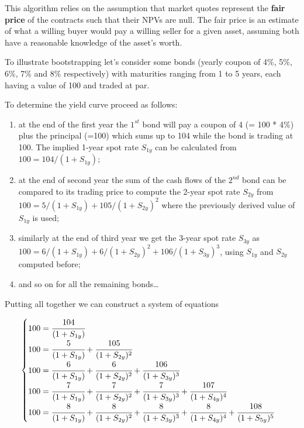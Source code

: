 This algorithm relies on the assumption that market quotes represent the \textbf{fair price} of the contracts such that their NPVs are null. The fair price is an estimate of what a willing buyer would pay a willing seller for a given asset, assuming both have a reasonable knowledge of the asset's worth.

To illustrate bootstrapping let's consider some bonds (yearly coupon of 4\%, 5\%, 6\%, 7\% and 8\% respectively) with maturities ranging from 1 to 5 years, each having a value of 100 and traded at par. 

To determine the yield curve proceed as follows:
\begin{enumerate}
\item at the end of the first year the $1^{st}$ bond will pay a coupon of 4 (= 100 * 4\%) plus the principal (=100) which sums up to 104 while the bond is trading at 100. The implied 1-year spot rate $S_{1y}$ can be calculated from $\mbox{100} = \mbox{104} / (1 + S_{1y})$;

\item at the end of second year the sum of the cash flows of the $2^{nd}$ bond can be compared to its trading price to compute the 2-year spot rate $S_{2y}$ from $\mbox{100} = \mbox{5} / (1 + S_{1y}) + \mbox{105} / (1 + S_{2y})^{2}$ where the previously derived value of $S_{1y}$ is used;

\item similarly at the end of third year we get the 3-year spot rate $S_{3y}$ as $\mbox{100} = \mbox{6} / (1 + S_{1y}) + \mbox{6} / (1 + S_{2y})^{2} + \mbox{106} / (1 + S_{3y})^{3}$, using $S_{1y}$ and $S_{2y}$ computed before;

\item and so on for all the remaining bonds\ldots
\end{enumerate}

Putting all together we can construct a system of equations

\begin{equation}
\begin{cases}
100 = \cfrac{104}{(1 + S_{1y})} \\
100 = \cfrac{5}{(1 + S_{1y})} + \cfrac{105}{(1 + S_{2y})^{2}} \\
100 = \cfrac{6} {(1 + S_{1y})} + \cfrac{6}{(1 + S_{2y})^{2}} + \cfrac{106} {(1 + S_{3y})^{3}} \\
100 = \cfrac{7} {(1 + S_{1y})} + \cfrac{7} {(1 + S_{2y})^{2}} + \cfrac{7} {(1 + S_{3y})^{3}} + \cfrac{107} {(1 + S_{4y})^{4}} \\
100 = \cfrac{8} {(1 + S_{1y})} + \cfrac{8} {(1 + S_{2y})^{2}}+ \cfrac{8} {(1 + S_{3y})^{3}} + \cfrac{8} {(1 + S_{4y})^{4}} + \cfrac{108} {(1 + S_{5y})^{5}}
\end{cases}
\label{eq:fifth_year_rate}
\end{equation}

